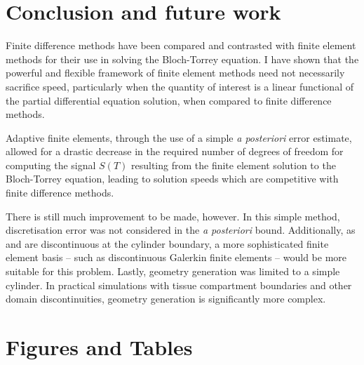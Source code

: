 \documentclass[twocolumn,twoside]{article}
\begin{document}
\section*{Conclusion and future work}
Finite difference methods have been compared and contrasted with finite element methods for their use in solving the Bloch-Torrey equation.
I have shown that the powerful and flexible framework of finite element methods need not necessarily sacrifice speed, particularly when the quantity of interest is a linear functional of the partial differential equation solution, when compared to finite difference methods.

Adaptive finite elements, through the use of a simple \textit{a posteriori} error estimate, allowed for a drastic decrease in the required number of degrees of freedom for computing the signal $S(T)$ resulting from the finite element solution to the Bloch-Torrey equation, leading to solution speeds which are competitive with finite difference methods.

There is still much improvement to be made, however.
In this simple method, discretisation error was not considered in the \textit{a posteriori} bound.
Additionally, as \rr{} and \ww{} are discontinuous at the cylinder boundary, a more sophisticated finite element basis -- such as discontinuous Galerkin finite elements -- would be more suitable for this problem.
Lastly, geometry generation was limited to a simple cylinder.
In practical simulations with tissue compartment boundaries and other domain discontinuities, geometry generation is significantly more complex.



%

{\footnotesize}

\clearpage
\section*{Figures and Tables}
\end{document}
